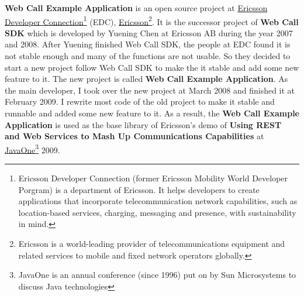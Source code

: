 \textbf{Web Call Example Application} is an open source project at \href{http://www.ericsson.com/developer/}{Ericsson Developer Connection}\footnote{Ericsson Developer Connection (former Ericsson Mobility World Developer Porgram) is a department of Ericsson. It helps developers to create applications that incorporate telecommunication network capabilities, such as location-based services, charging, messaging and presence, with sustainability in mind.} (EDC), \href{http://www.ericsson.com/}{Ericsson}\footnote{Ericsson is a world-leading provider of telecommunications equipment and related services to mobile and fixed network operators globally.}. It is the successor project of \textbf{Web Call SDK}\cite{WebCallSDK} which is developed by Yuening Chen at Ericsson AB during the year 2007 and 2008. After Yuening finished Web Call SDK, the people at EDC found it is not stable enough and many of the functions are not usable. So they decided to start a new project follow Web Call SDK to make the it stable and add some new feature to it. The new project is called \textbf{Web Call Example Application}. As the main developer, I took over the new project at March 2008 and finished it at February 2009. I rewrite most code of the old project to make it stable and runnable and added some new feature to it. As a result, the \textbf{Web Call Example Application} is used as the base library of Ericsson's demo of \textbf{Using REST and Web Services to Mash Up Communications Capabilities}\cite{DemoAtJavaOne}\cite{EricssonJavaOne} at \href{http://java.sun.com/javaone/}{JavaOne}\texttrademark\footnote{JavaOne is an annual conference (since 1996) put on by Sun Microsystems to discuss Java technologies} 2009.
